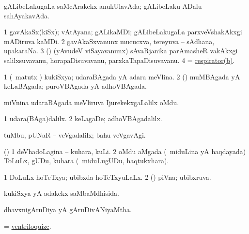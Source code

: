 \bentry
{} 
\gl{\gu}
\expl{}
\bmng
 gALibeLakugaLa saMcArakekx anukUlavAda; gALibeLaku ADalu sahAyakavAda. 
\emng
\eentry

\bentry
{} 
\gl{\nA}
\expl{}
\bmng
\bnum
\num{1} gavAkaSx(kiSx); vAtAyana; gALikaMDi; gALibeLakugaLa parxveVshakAkxgi mADiruva kaMDi. 
\num{2} gavAkaSxvanunx mucucxva, tereyuva -- sAdhana, upakaraNa. 
\num{3} (\rUpa) (yAvudeV viSayavanunx) sAvaRjanika parAmasheR \mo vakAkxgi salilxsuvavanu, horapaDisuvavanu, parxkaTapaDisuvavanu. 
\num{4} = \hyperref{kandict_r.pdf}{R}{respirator(b)1}{respirator(b)}. 
\enum
\emng
\eentry

\bentry
{} 
\gl{\gu}
\expl{}
\bmng
\bnum
\num{1} (\pArxvi\ matutx \aMrashA) kukiSxya; udaraBAgada yA adara meVlina. 
\num{2} (\savi) muMBAgada yA keLaBAgada; puroVBAgada yA adhoVBAgada. 
\enum
\emng
\eentry

\bentry
{}
\gl{\nA}
\expl{}
\bmng
 miVnina udaraBAgada meVliruva IjurekekxgaLalilx oMdu. 
\emng
\eentry

\bentry
{} 
\gl{\kirxvi}
\expl{}
\bmng
\bnum
\num{1} udara(BAga)dalilx. 
\num{2} keLagaDe; adhoVBAgadalilx. 
\enum
\emng
\eentry

\bentry
{} 
\gl{\kirxvi}
\expl{\F}
\bmng
 tuMbu, pUNaR -- veVgadalilx; bahu veVgavAgi. 
\emng
\eentry

\bentry
{} 
\gl{\nA}
\expl{}
\bmng
 (\aMrashA) 
\bnum
\num{1} deVhadoLagina -- kuhara, kuLi. 
\num{2} oMdu aMgada (\kanmu\ miduLina yA haqdayada) ToLuLx, gUDu, kuhara (\kanmu\ miduLugUDu, haqtukxhara). 
\enum
\emng
\eentry

\bentry
{} 
\gl{\gu}
\expl{}
\bmng
\bnum
\num{1} DoLuLx hoTeTxya; ubibxda hoTeTxyuLaLx. 
\num{2} (\savi) piVna; ubibxruva. 
\enum
\emng
\eentry

\bentry
{} 
\gl{\gu}
\expl{}
\bmng
 kukiSxya yA adakekx saMbaMdhisida. 
\emng
\eentry

\bentry
{} 
\gl{\gu}
\expl{}
\bmng
 dhavxnigAruDiya yA gAruDivANiyaMtha. 
\emng
\eentry

\bentry
{} 
\gl{\akirx}
\expl{}
\bmng
 = \hyperlink{ventriloquize}{ventriloquize}. 
\emng
\eentry

